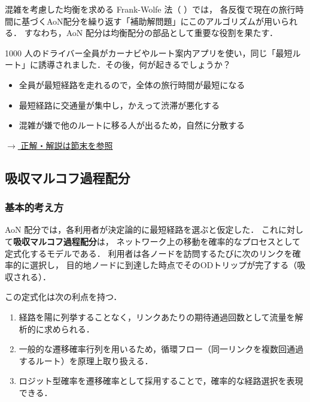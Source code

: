 混雑を考慮した均衡を求める Frank-Wolfe 法（ ）では，
各反復で現在の旅行時間に基づくAoN配分を繰り返す「補助解問題」にこのアルゴリズムが用いられる．
すなわち，AoN 配分は均衡配分の部品として重要な役割を果たす．

\begin{example}[title={クイズ 2：カーナビが全員に同じ「最短ルート」を案内したら？}]
1000 人のドライバー全員がカーナビやルート案内アプリを使い，同じ「最短ルート」に誘導されました．その後，何が起きるでしょうか？
\begin{itemize}
  \item[(ア)] 全員が最短経路を走れるので，全体の旅行時間が最短になる
  \item[(イ)] 最短経路に交通量が集中し，かえって渋滞が悪化する
  \item[(ウ)] 混雑が嫌で他のルートに移る人が出るため，自然に分散する
\end{itemize}
\hyperref[ans:q2]{$\rightarrow$ 正解・解説は節末を参照}
\end{example}

\subsection{吸収マルコフ過程配分}
\label{subsec:markov-assignment}

\subsubsection*{基本的考え方}

AoN 配分では，各利用者が決定論的に最短経路を選ぶと仮定した．
これに対して\textbf{吸収マルコフ過程配分}は，
ネットワーク上の移動を確率的なプロセスとして定式化するモデルである\cite{Akamatsu1996}．
利用者は各ノードを訪問するたびに次のリンクを確率的に選択し，
目的地ノードに到達した時点でそのODトリップが完了する（吸収される）．

この定式化は次の利点を持つ．
\begin{enumerate}
  \item 経路を陽に列挙することなく，リンクあたりの期待通過回数として流量を解析的に求められる．
  \item 一般的な遷移確率行列を用いるため，循環フロー（同一リンクを複数回通過するルート）を原理上取り扱える\cite{Akamatsu1996}．
  \item ロジット型確率を遷移確率として採用することで，確率的な経路選択を表現できる．
\end{enumerate}

